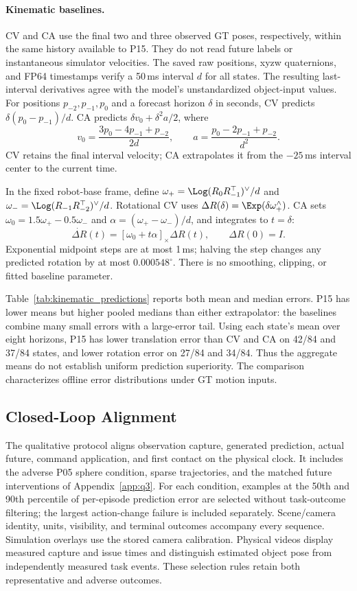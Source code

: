 \paragraph{Kinematic baselines.}
CV and CA use the final two and three observed GT poses, respectively,
within the same history available to P15. They do not read future labels
or instantaneous simulator velocities. The saved raw positions, xyzw
quaternions, and FP64 timestamps verify a 50\,ms interval $d$ for all states.
The resulting last-interval derivatives agree with the model's unstandardized
object-input values. For positions $p_{-2},p_{-1},p_0$ and a forecast horizon
$\delta$ in seconds, CV predicts $\delta(p_0-p_{-1})/d$.
CA predicts $\delta v_0+\delta^2a/2$, where
\[
v_0=\frac{3p_0-4p_{-1}+p_{-2}}{2d},\qquad
a=\frac{p_0-2p_{-1}+p_{-2}}{d^2}.
\]
CV retains the final interval velocity; CA extrapolates it from the
$-25$\,ms interval center to the current time.

In the fixed robot-base frame, define
$\omega_+=\Log(R_0R_{-1}^{\top})^\vee/d$ and
$\omega_-=\Log(R_{-1}R_{-2}^{\top})^\vee/d$.
Rotational CV uses $\Delta R(\delta)=\Exp(\delta\omega_+^\wedge)$.
CA sets $\omega_0=1.5\omega_+-0.5\omega_-$ and
$\alpha=(\omega_+-\omega_-)/d$, and integrates to $t=\delta$:
\[
\dot{\Delta R}(t)=[\omega_0+t\alpha]_\times\Delta R(t),
\qquad \Delta R(0)=I.
\]
Exponential midpoint steps are at most 1\,ms; halving the step changes
any predicted rotation by at most $0.000548^\circ$.
There is no smoothing, clipping, or fitted baseline parameter.


Table~\ref{tab:kinematic_predictions} reports both mean and median errors.
P15 has lower means but higher pooled medians than either extrapolator:
the baselines combine many small errors with a large-error tail.
Using each state's mean over eight horizons, P15 has lower translation
error than CV and CA on 42/84 and 37/84 states, and lower rotation error on
27/84 and 34/84. Thus the aggregate means do not establish uniform prediction
superiority. The comparison characterizes offline error distributions
under GT motion inputs.

\subsection{Closed-Loop Alignment}
The qualitative protocol aligns observation capture, generated prediction,
actual future, command application, and first contact on the physical clock.
It includes the adverse P05 sphere condition, sparse trajectories, and the
matched future interventions of Appendix~\ref{app:q3}. For each condition,
examples at the 50th and 90th percentile of per-episode prediction error
are selected without task-outcome filtering; the largest action-change
failure is included separately. Scene/camera identity, units, visibility,
and terminal outcomes accompany every sequence. Simulation overlays use
the stored camera calibration. Physical videos display measured capture
and issue times and distinguish estimated object pose from independently
measured task events. These selection rules retain both representative
and adverse outcomes.

